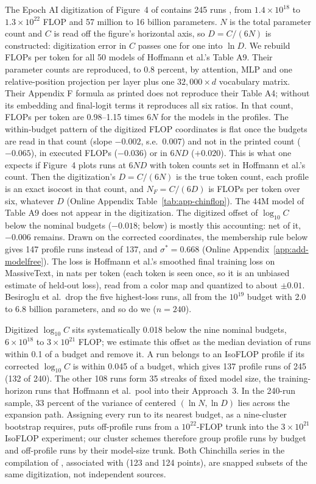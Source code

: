 The Epoch AI digitization of Figure~4 of \citet{hoffmann2022training} contains 245 runs \citep{besiroglu2024chinchilla},
from $1.4\times10^{18}$ to $1.3\times10^{22}$ FLOP and 57 million to 16 billion parameters. $N$ is the total parameter
count and $C$ is read off the figure's horizontal axis, so $D=C/(6N)$ is constructed: digitization error in $C$ passes
one for one into $\ln D$. We rebuild FLOPs per token for all 50 models of Hoffmann et al.'s Table A9. Their parameter
counts are reproduced, to 0.8 percent, by attention, MLP and one relative-position projection per layer plus one
$32{,}000\times d$ vocabulary matrix. Their Appendix F formula as printed does not reproduce their Table A4; without its
embedding and final-logit terms it reproduces all six ratios. In that count, FLOPs per token are 0.98--1.15 times $6N$
for the models in the profiles. The within-budget pattern of the digitized FLOP coordinates is flat once the budgets are
read in that count (slope $-0.002$, s.e.\ 0.007) and not in the printed count ($-0.065$), in executed FLOPs ($-0.036$) or
in $6ND$ ($+0.020$). This is what one expects if Figure~4 plots runs at $6ND$ with token counts set in Hoffmann et al.'s
count. Then the digitization's $D=C/(6N)$ is the true token count, each profile is an exact isocost in that count, and
$N_F=C/(6D)$ is FLOPs per token over six, whatever $D$ (Online Appendix Table~\ref{tab:app-chinflop}). The 44M model
of Table A9 does not appear in the digitization. The digitized offset of $\log_{10}C$ below the nominal budgets
($-0.018$; below) is mostly this accounting: net of it, $-0.006$ remains. Drawn on the corrected coordinates, the
membership rule below gives 147 profile runs instead of 137, and $\sigma^*=0.668$ (Online
Appendix~\ref{app:add-modelfree}). The loss is Hoffmann et al.'s smoothed final training loss on MassiveText, in nats
per token (each token is seen once, so it is an unbiased estimate of held-out loss), read from a color map and quantized
to about $\pm0.01$. Besiroglu et al.\ drop the five highest-loss runs, all from the $10^{19}$ budget with 2.0 to 6.8 billion
parameters, and so do we ($n=240$).

Digitized $\log_{10}C$ sits systematically 0.018 below the nine nominal budgets, $6\times10^{18}$ to $3\times10^{21}$
FLOP; we estimate this offset as the median deviation of runs within 0.1 of a budget and remove it. A run belongs to an
IsoFLOP profile if its corrected $\log_{10}C$ is within 0.045 of a budget, which gives 137 profile runs of 245 (132 of
240). The other 108 runs form 35 streaks of fixed model size, the training-horizon runs that Hoffmann et al.\ pool into
their Approach~3. In the 240-run sample, 33 percent of the variance of centered $(\ln N,\ln D)$ lies across the expansion
path. Assigning every run to its nearest budget, as a nine-cluster bootstrap requires, puts off-profile runs from a
$10^{22}$-FLOP trunk into the $3\times10^{21}$ IsoFLOP experiment; our cluster schemes therefore group profile runs by
budget and off-profile runs by their model-size trunk. Both Chinchilla series in the compilation of
\citet{openathena2026isoflop}, associated with \citet{czech2026problems} (123 and 124 points), are snapped subsets of the
same digitization, not independent sources.


